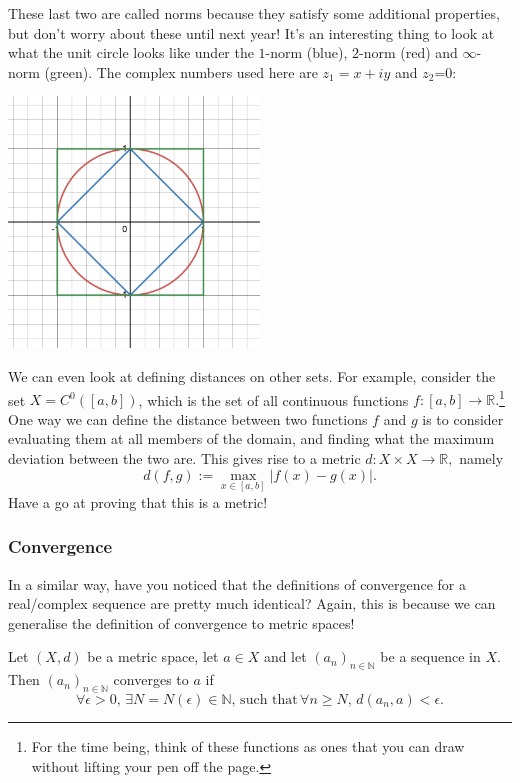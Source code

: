 \documentclass[
  12pt,
  a4paper]{extarticle}
\theoremstyle{plain}
\theoremstyle{definition}
\theoremstyle{plain}
\theoremstyle{plain}
\theoremstyle{plain}
\theoremstyle{plain}
\theoremstyle{definition}
\theoremstyle{definition}
\theoremstyle{remark}
\theoremstyle{remark}
\let\BeginKnitrBlock\begin \let\EndKnitrBlock\end
\renewcommand{\;}{\,}
\begin{document}
These last two are called norms because they satisfy some additional properties, but don't worry about these until next year! It's an interesting thing to look at what the unit circle looks like under the \(1\)-norm (blue), \(2\)-norm (red) and \(\infty\)-norm (green). The complex numbers used here are \(z_1 = x + iy\) and \(z_2\)=0:

\includegraphics[width=0.5\textwidth,height=\textheight]{unitcircle.png}

We can even look at defining distances on other sets. For example, consider the set \(X = C^{0}([a,b])\), which is the set of all continuous functions \(f:[a,b] \to \mathbb{R}.\)\footnote{For the time being, think of these functions as ones that you can draw without lifting your pen off the page.} One way we can define the distance between two functions \(f\) and \(g\) is to consider evaluating them at all members of the domain, and finding what the maximum deviation between the two are. This gives rise to a metric \(d:X\times X \to \mathbb{R},\) namely \[d(f,g) := \max_{x \in [a,b]} \lvert f(x) - g(x) \rvert.\] Have a go at proving that this is a metric!

\hypertarget{convergence}{%
\subsubsection{Convergence}\label{convergence}}

In a similar way, have you noticed that the definitions of convergence for a real/complex sequence are pretty much identical? Again, this is because we can generalise the definition of convergence to metric spaces!

\BeginKnitrBlock{definition}[Convergence]
{\label{def:def4} }Let \((X,d)\) be a metric space, let \(a \in X\) and let \((a_n)_{n\in\mathbb{N}}\) be a sequence in \(X\). Then \((a_n)_{n\in\mathbb{N}}\) converges to \(a\) if \[\forall \epsilon > 0, \; \exists N = N(\epsilon) \in \mathbb{N}, \; \text{such that} \; \forall n \geq N, \; d(a_n,a) < \epsilon.\]
\EndKnitrBlock{definition}
\end{document}
